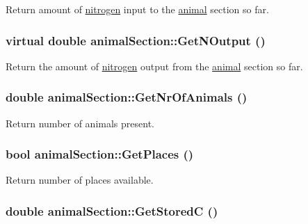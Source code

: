 Return amount of \hyperlink{classnitrogen}{nitrogen} input to the \hyperlink{classanimal}{animal} section so far. \hypertarget{classanimal_section_a3c7dd42cc4cc52620e5aee9fe458d823}{
\subsubsection[{GetNOutput}]{\setlength{\rightskip}{0pt plus 5cm}virtual double animalSection::GetNOutput ()}}
\label{classanimal_section_a3c7dd42cc4cc52620e5aee9fe458d823}


Return the amount of \hyperlink{classnitrogen}{nitrogen} output from the \hyperlink{classanimal}{animal} section so far. \hypertarget{classanimal_section_a724eda30485b354884e11a3c762b54c0}{
\subsubsection[{GetNrOfAnimals}]{\setlength{\rightskip}{0pt plus 5cm}double animalSection::GetNrOfAnimals ()}}
\label{classanimal_section_a724eda30485b354884e11a3c762b54c0}


Return number of animals present. \hypertarget{classanimal_section_a263b40a7d973437e37ab791bb394dc1d}{
\subsubsection[{GetPlaces}]{\setlength{\rightskip}{0pt plus 5cm}bool animalSection::GetPlaces ()}}
\label{classanimal_section_a263b40a7d973437e37ab791bb394dc1d}


Return number of places available. \hypertarget{classanimal_section_ad17932a2af90cbb6b9b90ddb4c23ecd5}{
\subsubsection[{GetStoredC}]{\setlength{\rightskip}{0pt plus 5cm}double animalSection::GetStoredC ()}}
\label{classanimal_section_ad17932a2af90cbb6b9b90ddb4c23ecd5}


